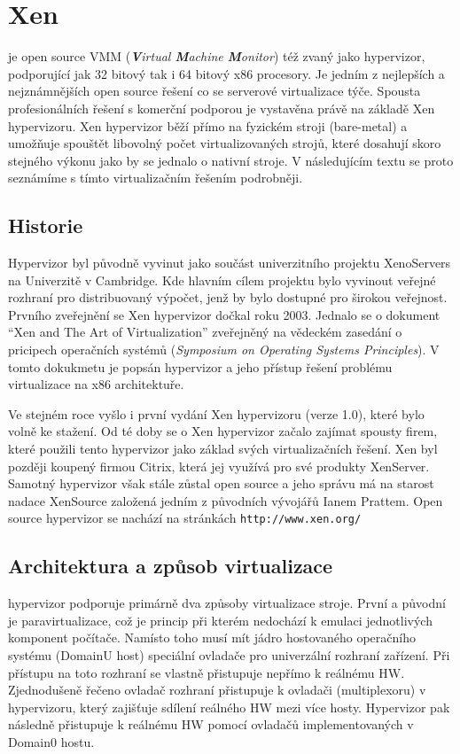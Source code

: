 \section{Xen\textsuperscript{\textregistered}}
\xen je open source VMM (\textit{\textbf{V}irtual \textbf{M}achine \textbf{M}onitor}) též zvaný jako hypervizor, podporující jak 32 bitový tak i 64 bitový x86 procesory. Je jedním z nejlepších a nejznámnějších open source řešení co se serverové virtualizace týče. Spousta profesionálních řešení s komerční podporou je vystavěna právě na základě Xen hypervizoru. Xen hypervizor běží přímo na fyzickém stroji (bare-metal) a umožňuje spouštět libovolný počet virtualizovaných strojů, které dosahují skoro stejného výkonu jako by se jednalo o nativní stroje. V následujícím textu se proto seznámíme s tímto virtualizačním řešením podrobněji.

\subsection{Historie}
Hypervizor \xen byl původně vyvinut jako součást univerzitního projektu XenoServers na Univerzitě v Cambridge. Kde hlavním cílem projektu bylo vyvinout veřejné rozhraní pro distribuovaný výpočet, jenž by bylo dostupné pro širokou veřejnost. Prvního zveřejnění se Xen hypervizor dočkal roku 2003. Jednalo se o dokument "`Xen and The Art of Virtualization"' zveřejněný na vědeckém zasedání o pricipech operačních systémů (\emph{Symposium on Operating Systems Principles}). V tomto dokukmetu je popsán hypervizor a jeho přístup řešení problému virtualizace na x86 architektuře.

Ve stejném roce vyšlo i první vydání Xen hypervizoru (verze 1.0), které bylo volně ke stažení. Od té doby se o Xen hypervizor začalo zajímat spousty firem, které použili tento hypervizor jako základ svých virtualizačních řešení. Xen byl později koupený firmou Citrix, která jej využívá pro své produkty XenServer. Samotný hypervizor však stále zůstal open source a jeho správu má na starost nadace XenSource založená jedním z původních vývojářů Ianem Prattem. Open source hypervizor se nachází na stránkách \texttt{http://www.xen.org/ }

\subsection{Architektura a způsob virtualizace}
\xen hypervizor podporuje primárně dva způsoby virtualizace stroje. První a původní je paravirtualizace, což je princip při kterém nedochází k emulaci jednotlivých komponent počítače. Namísto toho musí mít jádro hostovaného operačního systému (DomainU host) speciální ovladače pro univerzální rozhraní zařízení. Při přístupu na toto rozhraní se vlastně přistupuje nepřímo k reálnému HW. Zjednodušeně řečeno ovladač rozhraní přistupuje k ovladači (multiplexoru) v hypervizoru, který zajišťuje sdílení reálného HW mezi více hosty. Hypervizor pak následně přistupuje k reálnému HW pomocí ovladačů implementovaných v Domain0 hostu.

